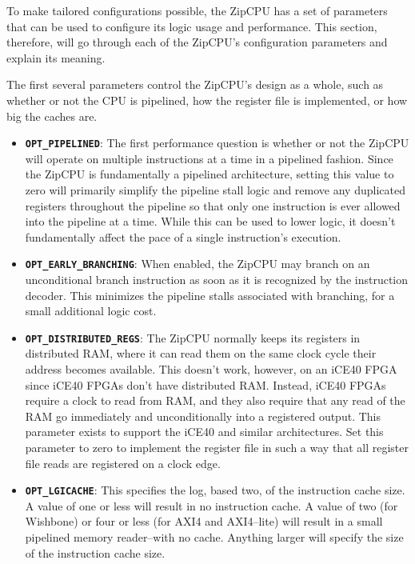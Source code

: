 \documentclass{gqtekspec}
\begin{document}
To make tailored configurations possible, the ZipCPU has a set of parameters
that can be used to configure its logic usage and performance.  This
section, therefore, will go through each of the ZipCPU's configuration
parameters and explain its meaning.

The first several parameters control the ZipCPU's design as a whole, such
as whether or not the CPU is pipelined, how the register file is implemented,
or how big the caches are.

\begin{itemize}
\item {\bf\tt OPT\_PIPELINED}:  The first performance question is whether or
	not the ZipCPU will operate on multiple instructions at a time in a
	pipelined fashion.  Since the ZipCPU is fundamentally a pipelined
	architecture, setting this value to zero will primarily simplify the
	pipeline stall logic and remove any duplicated registers throughout
	the pipeline so that only one instruction is ever allowed into
	the pipeline at a time.  While this can be used to lower logic,
	it doesn't fundamentally affect the pace of a single instruction's
	execution.

\item {\bf\tt OPT\_EARLY\_BRANCHING}:  When enabled, the ZipCPU may branch
	on an unconditional branch instruction as soon as it is recognized
	by the instruction decoder.  This minimizes the pipeline stalls
	associated with branching, for a small additional logic cost.

\item {\bf\tt OPT\_DISTRIBUTED\_REGS}:  The ZipCPU normally keeps its registers
	in distributed RAM, where it can read them on the same clock cycle
	their address becomes available.  This doesn't work, however, on an
	iCE40 FPGA since iCE40 FPGAs don't have distributed RAM.  Instead,
	iCE40 FPGAs require a clock to read from RAM, and they also require
	that any read of the RAM go immediately and unconditionally into a
	registered output.  This parameter exists to support the iCE40 and
	similar architectures.  Set this parameter to zero to implement the
	register file in such a way that all register file reads are registered
	on a clock edge.

\item {\bf\tt OPT\_LGICACHE}: This specifies the log, based two, of the
	instruction cache size.  A value of one or less will result in no
	instruction cache.  A value of two (for Wishbone) or four or less
	(for AXI4 and AXI4--lite) will result in a small pipelined memory
	reader--with no cache.  Anything larger will specify the size of the
	instruction cache size.


\end{itemize}
\end{document}
